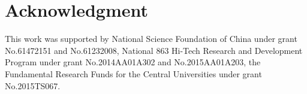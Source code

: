 \documentclass[10pt,conference,compsocconf,letterpaper]{IEEEtran}
\begin{document}
\section*{Acknowledgment}
  This work was supported by National Science Foundation of China under grant No.61472151 and No.61232008, National 863 Hi-Tech Research and Development Program under grant No.2014AA01A302 and No.2015AA01A203, the Fundamental Research Funds for the Central Universities under grant No.2015TS067.



\end{document}
